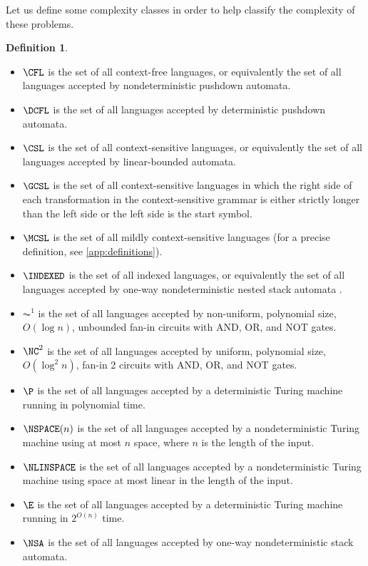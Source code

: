 \documentclass{article}
\theoremstyle{remark} \newtheorem{technicality}{Technical note}
\theoremstyle{definition} \newtheorem{definition}{Definition}
\theoremstyle{definition} \newtheorem{openproblem}{Open problem}
\begin{document}
Let us define some complexity classes in order to help classify the complexity of these problems.
\begin{definition}\mbox{}
  \begin{itemize}
  \item $\CFL$ is the set of all context-free languages, or equivalently the set of all languages accepted by nondeterministic pushdown automata.
  \item $\DCFL$ is the set of all languages accepted by deterministic pushdown automata.
  \item $\CSL$ is the set of all context-sensitive languages, or equivalently the set of all languages accepted by linear-bounded automata.
  \item $\GCSL$ is the set of all context-sensitive languages in which the right side of each transformation in the context-sensitive grammar is either strictly longer than the left side or the left side is the start symbol.
  \item $\MCSL$ is the set of all mildly context-sensitive languages (for a precise definition, see \autoref{app:definitions}).
  \item $\INDEXED$ is the set of all indexed languages, or equivalently the set of all languages accepted by one-way nondeterministic nested stack automata \cite{aho}.
  \item $\AC^1$ is the set of all languages accepted by non-uniform, polynomial size, $O(\log n)$, unbounded fan-in circuits with AND, OR, and NOT gates.
  \item $\NC^2$ is the set of all languages accepted by uniform, polynomial size, $O(\log^2 n)$, fan-in 2 circuits with AND, OR, and NOT gates.
  \item $\P$ is the set of all languages accepted by a deterministic Turing machine running in polynomial time.
  \item $\NSPACE(n)$ is the set of all languages accepted by a nondeterministic Turing machine using at most $n$ space, where $n$ is the length of the input.
  \item $\NLINSPACE$ is the set of all languages accepted by a nondeterministic Turing machine using space at most linear in the length of the input.
  \item $\E$ is the set of all languages accepted by a deterministic Turing machine running in $2^{O(n)}$ time.
  \item $\NSA$ is the set of all languages accepted by one-way nondeterministic stack automata.
  \end{itemize}
\end{definition}
\end{document}
